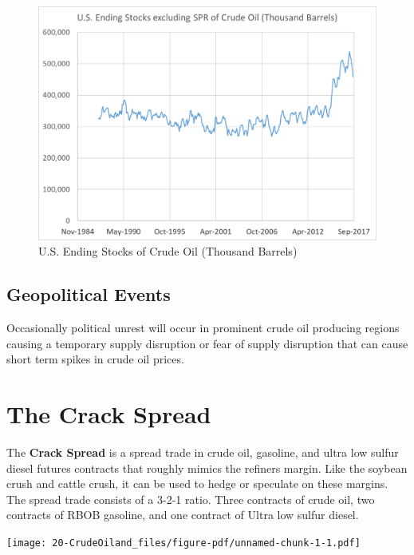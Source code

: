 \documentclass[
  letterpaper,
  DIV=11,
  numbers=noendperiod]{scrreprt}
\begin{document}
\begin{figure}

{\centering \includegraphics{Excel-files/CrudeOiland-crudeoil_files/image007.png}

}

\caption{U.S. Ending Stocks of Crude Oil (Thousand Barrels)}

\end{figure}

\hypertarget{geopolitical-events}{%
\subsection{Geopolitical Events}\label{geopolitical-events}}

Occasionally political unrest will occur in prominent crude oil
producing regions causing a temporary supply disruption or fear of
supply disruption that can cause short term spikes in crude oil prices.

\hypertarget{the-crack-spread}{%
\section{The Crack Spread}\label{the-crack-spread}}

The \textbf{Crack Spread} is a spread trade in crude oil, gasoline, and
ultra low sulfur diesel futures contracts that roughly mimics the
refiners margin. Like the soybean crush and cattle crush, it can be used
to hedge or speculate on these margins. The spread trade consists of a
3-2-1 ratio. Three contracts of crude oil, two contracts of RBOB
gasoline, and one contract of Ultra low sulfur diesel.

\texttt{[image: 20-CrudeOiland\_files/figure-pdf/unnamed-chunk-1-1.pdf]}
\end{document}
